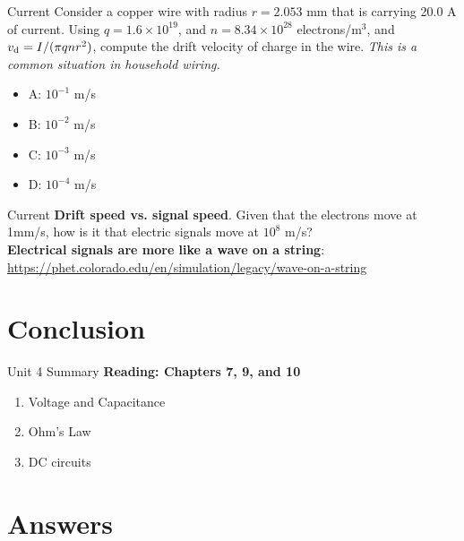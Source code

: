 \documentclass{beamer}
\begin{document}
\begin{frame}{Current}
Consider a copper wire with radius $r = 2.053$ mm that is carrying 20.0 A of current.  Using $q = 1.6\times 10^{19}$, and $n = 8.34 \times 10^{28}$ electrons/m$^3$, and $v_{\rm d} = I/(\pi q n r^2)$, compute the drift velocity of charge in the wire.  \textit{This is a common situation in household wiring.}
\begin{itemize}
\item A: $10^{-1}$ m/s
\item B: $10^{-2}$ m/s
\item C: $10^{-3}$ m/s
\item D: $10^{-4}$ m/s
\end{itemize}
\end{frame}

\begin{frame}{Current}
\textbf{Drift speed vs. signal speed}.  Given that the electrons move at 1mm/s, how is it that electric signals move at $10^8$ m/s? \\ \vspace{1cm}
\textbf{Electrical signals are more like a \alert{wave on a string}}: \\ \url{https://phet.colorado.edu/en/simulation/legacy/wave-on-a-string}
\end{frame}

\section{Conclusion}

\begin{frame}{Unit 4 Summary}
\textbf{Reading: Chapters 7, 9, and 10}
\begin{enumerate}
\item \alert{Voltage and Capacitance}
\item Ohm's Law
\item DC circuits
\end{enumerate}
\end{frame}

\section{Answers}
\end{document}
